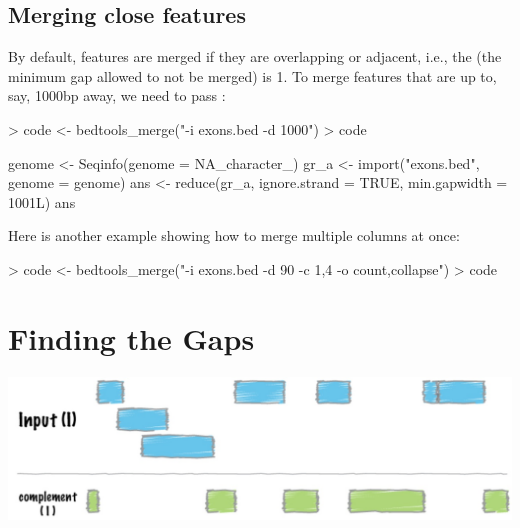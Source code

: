 \documentclass[10pt]{article}
\begin{document}
\subsection{Merging close features}

By default, features are merged if they are overlapping or adjacent,
i.e., the  (the minimum gap allowed to not be
merged) is 1. To merge features that are up to, say, 1000bp away, we
need to pass :
\begin{Schunk}
\begin{Sinput}
> code <- bedtools_merge("-i exons.bed -d 1000")
> code
\end{Sinput}
\begin{Soutput}
{
    genome <- Seqinfo(genome = NA_character_)
    gr_a <- import("exons.bed", genome = genome)
    ans <- reduce(gr_a, ignore.strand = TRUE, min.gapwidth = 1001L)
    ans
}
\end{Soutput}
\end{Schunk}

Here is another example showing how to merge multiple columns at once:
\begin{Schunk}
\begin{Sinput}
> code <- bedtools_merge("-i exons.bed -d 90 -c 1,4 -o count,collapse")
> code
\end{Sinput}
\end{Schunk}

\section{Finding the Gaps}
\includegraphics{fig/complement.jpg}
\end{document}

